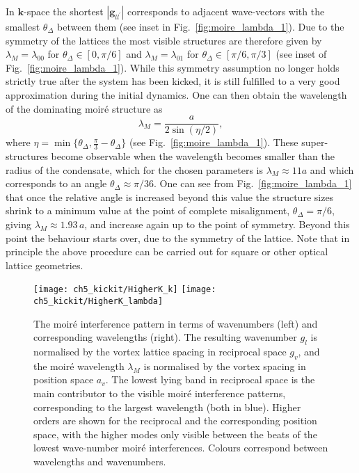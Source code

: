 In $\mathbf{k}$-space the shortest $|\mathbf{g}_{ll^\prime}|$ corresponds to adjacent wave-vectors with the smallest $\theta_\Delta$ between them (see inset in Fig.~\ref{fig:moire_lambda_1}). Due to the symmetry of the lattices the most visible structures are therefore given by $\lambda_M=\lambda_{00}$ for $\theta_\Delta\in[0,\pi/6]$ and $\lambda_M=\lambda_{01}$ for $\theta_\Delta\in[\pi/6,\pi/3]$ (see inset of Fig.~\ref{fig:moire_lambda_1}).
While this symmetry assumption no longer holds strictly true after the system has been kicked, it is still fulfilled to a very good approximation during the initial dynamics. One can then obtain the wavelength of the dominating moir\'e structure as~\cite{BIO:Blair_jneur_2007,SS:Yankowitz_natphys_2012}
    	\begin{equation}
    		\lambda_M = \frac{a}{2\sin(\eta/2)},
    		\label{eqn:moire_size}
    	\end{equation}
    where $\eta=\min\{\theta_\Delta,\frac{\pi}{3} - \theta_\Delta \} $  (see Fig.~\ref{fig:moire_lambda_1}).
These super-structures become observable when the wavelength becomes smaller than the radius of the condensate, which for the chosen parameters is $\lambda_M \approx 11a$ and which corresponds to an angle $\theta_\Delta \approx \pi/36$.
One can see from Fig.~\ref{fig:moire_lambda_1} that once the relative angle is increased beyond this value the structure sizes shrink to a minimum value at the point of complete misalignment, $\theta_\Delta=\pi/6$, giving $\lambda_M\approx 1.93\,a$, and increase again up to the point of symmetry. Beyond this point the behaviour starts over, due to the symmetry of the lattice. Note that in principle the above procedure can be carried out for square or other optical lattice geometries.

\begin{figure}
    \centering
    \texttt{[image: ch5\_kickit/HigherK\_k]}
    \texttt{[image: ch5\_kickit/HigherK\_lambda]}
    \caption[The moir\'e interference pattern in terms of wavenumbers.]{The moir\'e interference pattern in terms of wavenumbers (left) and corresponding wavelengths (right). The resulting wavenumber $g_l$ is normalised by the vortex lattice spacing in reciprocal space $g_v$, and the moir\'e wavelength $\lambda_M$ is normalised by the vortex spacing in position space $a_v$. The lowest lying band in reciprocal space is the main contributor to the visible moir\'e interference patterns, corresponding to the largest wavelength (both in blue). Higher orders are shown for the reciprocal and the corresponding position space, with the higher modes only visible between the beats of the lowest wave-number moir\'e interferences. Colours correspond between wavelengths and wavenumbers.}\label{fig:moire_higher}
\end{figure}

